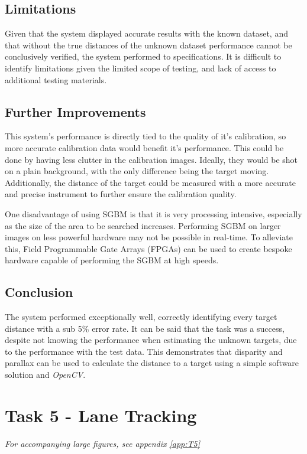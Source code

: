 \documentclass[conference]{IEEEtran}
\begin{document}
\subsection{Limitations}
Given that the system displayed accurate results with the known dataset, and that without the true distances of the unknown dataset performance cannot be conclusively verified, the system performed to specifications. It is difficult to identify limitations given the limited scope of testing, and lack of access to additional testing materials.

\subsection{Further Improvements} \label{sec:further1}
 This system's performance is directly tied to the quality of it's calibration, so more accurate calibration data would benefit it's performance. This could be done by having less clutter in the calibration images. Ideally, they would be shot on a plain background, with the only difference being the target moving. Additionally, the distance of the target could be measured with a more accurate and precise instrument to further ensure the calibration quality.
 
One disadvantage of using SGBM is that it is very processing intensive, especially as the size of the area to be searched increases. Performing SGBM on larger images on less powerful hardware may not be possible in real-time. To alleviate this, Field Programmable Gate Arrays (FPGAs) can be used to create bespoke hardware capable of performing the SGBM at high speeds\cite{HardwareSGBM}.
\subsection{Conclusion}
The system performed exceptionally well, correctly identifying every target distance with a sub 5\% error rate. It can be said that the task was a success, despite not knowing the performance when estimating the unknown targets, due to the performance with the test data. This demonstrates that disparity and parallax can be used to calculate the distance to a target using a simple software solution and \textit{OpenCV}. 

\section{Task 5 - Lane Tracking}
\textit{For accompanying large figures, see appendix \ref{app:T5}}
\end{document}
